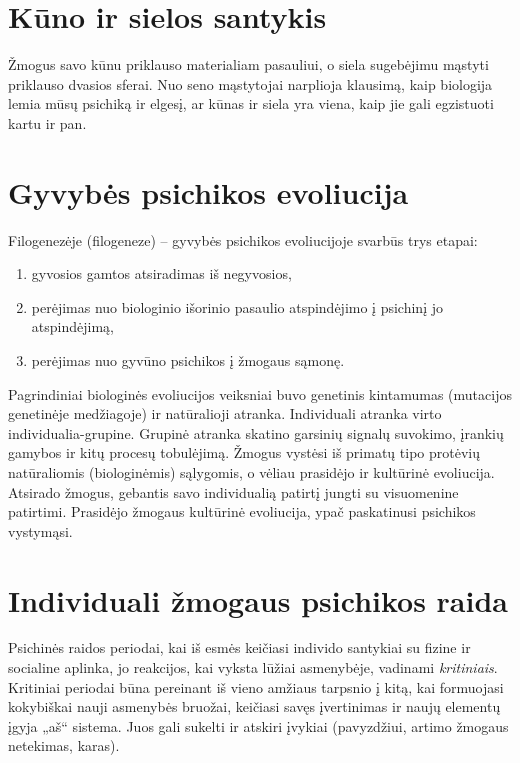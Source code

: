 \section{Kūno ir sielos santykis}

\label{tema:kuno_sielos_santykis}

Žmogus savo kūnu priklauso materialiam pasauliui, o siela sugebėjimu mąstyti
priklauso dvasios sferai. Nuo seno mąstytojai narplioja klausimą, kaip 
biologija lemia mūsų psichiką ir elgesį, ar kūnas ir siela yra viena, kaip 
jie gali egzistuoti kartu ir pan.

\section{Gyvybės psichikos evoliucija}

\label{tema:gyvybes_psichikos_evoliucija}

Filogenezėje (\gls{filogeneze}) – gyvybės psichikos evoliucijoje svarbūs 
trys etapai: 
\begin{enumerate}
  \item gyvosios gamtos atsiradimas iš negyvosios,
  \item perėjimas nuo biologinio išorinio pasaulio atspindėjimo į psichinį 
    jo atspindėjimą,
  \item perėjimas nuo gyvūno psichikos į žmogaus sąmonę.
\end{enumerate}

Pagrindiniai biologinės evoliucijos veiksniai buvo genetinis kintamumas
(mutacijos genetinėje medžiagoje) ir natūralioji atranka. Individuali 
atranka virto individualia-grupine. Grupinė atranka skatino garsinių signalų
suvokimo, įrankių gamybos ir kitų procesų tobulėjimą. Žmogus vystėsi iš 
primatų tipo protėvių natūraliomis (biologinėmis) sąlygomis, o vėliau 
prasidėjo ir kultūrinė evoliucija. Atsirado žmogus, gebantis savo 
individualią patirtį jungti su visuomenine patirtimi. Prasidėjo žmogaus
kultūrinė evoliucija, ypač paskatinusi psichikos vystymąsi.

\section{Individuali žmogaus psichikos raida}

\label{tema:psichikos_raida}

Psichinės raidos periodai, kai iš esmės keičiasi individo santykiai
su fizine ir socialine aplinka, jo reakcijos, kai vyksta lūžiai asmenybėje,
vadinami \emph{kritiniais}. Kritiniai periodai būna pereinant iš vieno 
amžiaus tarpsnio į kitą, kai formuojasi kokybiškai nauji asmenybės 
bruožai, keičiasi savęs įvertinimas ir naujų elementų įgyja „aš“ sistema.
Juos gali sukelti ir atskiri įvykiai (pavyzdžiui, artimo žmogaus netekimas, 
karas).


